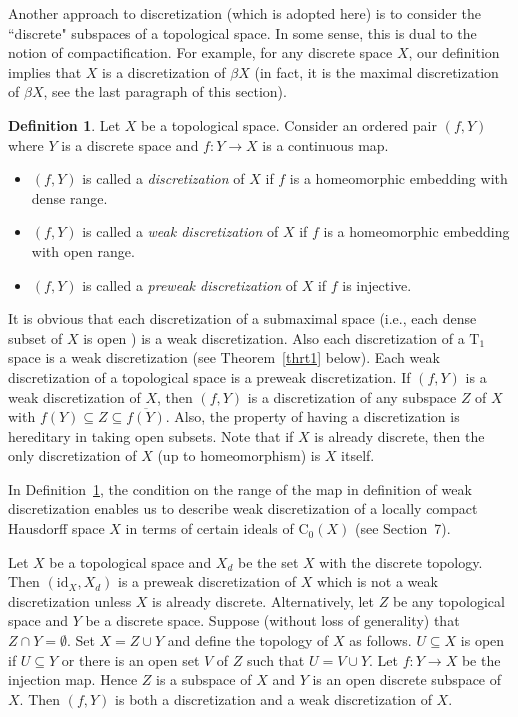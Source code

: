\documentclass[manuscript]{amsart}
\theoremstyle{definition}
\newtheorem{definition}{Definition}[section]
\begin{document}
Another approach to  discretization (which is adopted here) is to consider
the ``discrete" subspaces of a topological space. In some sense, this is dual to the notion of
 compactification. For example, for any discrete space $X$, our definition implies that
$X$ is a discretization of $\beta X$ (in fact, it is the maximal discretization of $\beta X$,
see the last paragraph of this section).
\begin{definition}\label{defdisc}
Let $X$ be a topological space. Consider an ordered pair
$(f,Y)$ where $Y$ is a discrete space and $f: Y\to X$ is a continuous map.
\begin{itemize}
\item[(1)] $(f,Y)$ is called a \emph{discretization} of $X$ if  $f$ is a homeomorphic
embedding with dense range.
\item[(2)] $(f,Y)$ is called a \emph{weak discretization} of $X$ if $f$ is  a
homeomorphic embedding with open range.
\item[(3)] $(f,Y)$ is called a \emph{preweak discretization} of $X$ if $f$ is injective.
\end{itemize}
\end{definition}

It is obvious that each discretization of a submaximal space (i.e., each dense subset of $X$ is open \cite{ac95}) is a weak discretization.
Also each discretization of a $\mathrm{T}_{1}$ space is a  weak discretization
(see Theorem~\ref{thrt1} below).
Each weak discretization  of a topological space  is a preweak discretization.
If $(f,Y)$ is a weak discretization of $X$, then $(f,Y)$ is a discretization of any subspace
$Z$ of $X$ with  $f(Y)\subseteq Z\subseteq \overline{f(Y)}$.
Also, the property of having a discretization is hereditary in taking open
subsets. Note that if $X$ is already discrete, then the only  discretization
of $X$ (up to homeomorphism) is $X$ itself.

In Definition~\ref{defdisc}, the condition on the range of
the map in definition of weak discretization  enables us to describe weak discretization of a locally compact
Hausdorff space $X$ in terms of certain ideals of $\mathrm{C}_{0}(X)$ (see Section~7).

Let $X$ be a topological space and $X_{d}$ be the set $X$ with the discrete topology.
Then $(\mathrm{id}_{X}, X_{d})$ is a preweak discretization of $X$
which is not a weak discretization unless $X$ is already discrete. Alternatively, 
let $Z$ be any topological space and $Y$ be a discrete space. Suppose (without loss of generality) that
$Z\cap Y=\emptyset$. Set $X=Z\cup Y$ and define the topology of $X$ as follows. $U\subseteq X$
is open if $U\subseteq Y$ or there is an open set $V$ of $Z$ such that  $U=V\cup Y$.
Let $f:Y\to X$ be the injection map. Hence $Z$ is a subspace of $X$ and $Y$ is an open
discrete subspace of $X$.
Then $(f,Y)$ is both a discretization and a weak discretization of $X$.
\end{document}
